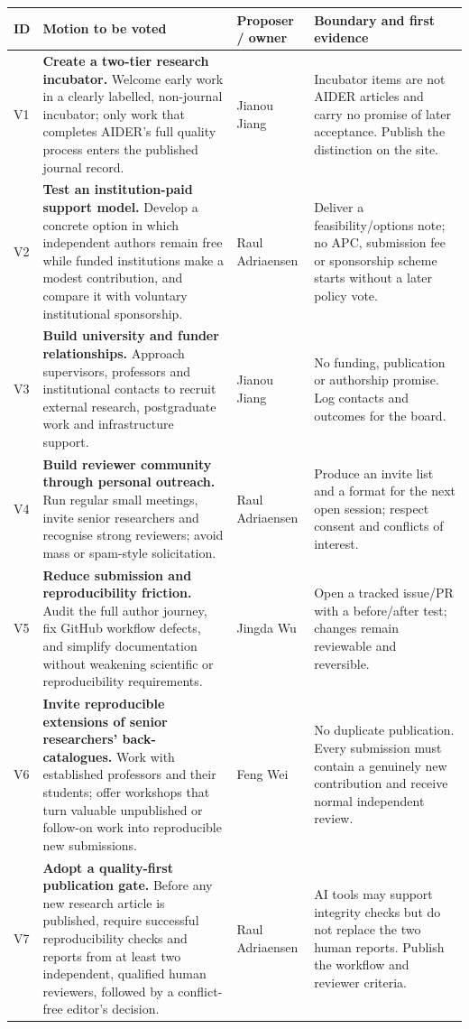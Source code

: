 \documentclass[11pt]{article}
\begin{document}
{\footnotesize\renewcommand{\arraystretch}{1.25}
\begin{longtable}{@{}p{0.65cm} p{8.25cm} p{2.15cm} p{3.35cm}@{}}
\toprule
\textbf{ID} & \textbf{Motion to be voted} & \textbf{Proposer / owner} & \textbf{Boundary and first evidence} \\
\midrule
\endhead
\bottomrule
\endlastfoot
V1 & \textbf{Create a two-tier research incubator.} Welcome early work in a clearly labelled, non-journal incubator; only work that completes AIDER's full quality process enters the published journal record. & Jianou Jiang & Incubator items are not AIDER articles and carry no promise of later acceptance. Publish the distinction on the site. \\
\addlinespace
V2 & \textbf{Test an institution-paid support model.} Develop a concrete option in which independent authors remain free while funded institutions make a modest contribution, and compare it with voluntary institutional sponsorship. & Raul Adriaensen & Deliver a feasibility/options note; no APC, submission fee or sponsorship scheme starts without a later policy vote. \\
\addlinespace
V3 & \textbf{Build university and funder relationships.} Approach supervisors, professors and institutional contacts to recruit external research, postgraduate work and infrastructure support. & Jianou Jiang & No funding, publication or authorship promise. Log contacts and outcomes for the board. \\
\addlinespace
V4 & \textbf{Build reviewer community through personal outreach.} Run regular small meetings, invite senior researchers and recognise strong reviewers; avoid mass or spam-style solicitation. & Raul Adriaensen & Produce an invite list and a format for the next open session; respect consent and conflicts of interest. \\
\addlinespace
V5 & \textbf{Reduce submission and reproducibility friction.} Audit the full author journey, fix GitHub workflow defects, and simplify documentation without weakening scientific or reproducibility requirements. & Jingda Wu & Open a tracked issue/PR with a before/after test; changes remain reviewable and reversible. \\
\addlinespace
V6 & \textbf{Invite reproducible extensions of senior researchers' back-catalogues.} Work with established professors and their students; offer workshops that turn valuable unpublished or follow-on work into reproducible new submissions. & Feng Wei & No duplicate publication. Every submission must contain a genuinely new contribution and receive normal independent review. \\
\addlinespace
V7 & \textbf{Adopt a quality-first publication gate.} Before any new research article is published, require successful reproducibility checks and reports from at least two independent, qualified human reviewers, followed by a conflict-free editor's decision. & Raul Adriaensen & AI tools may support integrity checks but do not replace the two human reports. Publish the workflow and reviewer criteria. \\
\end{longtable}}
\end{document}
